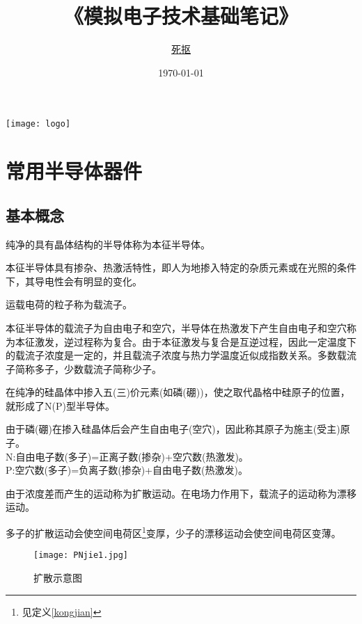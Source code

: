 \documentclass[cn,pad,11pt,geye]{elegantnote}
\title{\ttfamily《模拟电子技术基础笔记》}
\author{\href{https://github.com/sikouhjw}{死抠}}
\date{\today}
\begin{document}
\maketitle
\centerline{\texttt{[image: logo]}}

\section{常用半导体器件}
\subsection{基本概念}
\begin{definition}[本征半导体]
	纯净的具有晶体结构的半导体称为本征半导体。
\end{definition}
\begin{note}
	本征半导体具有掺杂、热激活特性，即人为地掺入特定的杂质元素或在光照的条件下，其导电性会有明显的变化。
\end{note}
\begin{definition}[载流子]
	运载电荷的粒子称为载流子。
\end{definition}
\begin{note}
	本征半导体的载流子为自由电子和空穴，半导体在热激发下产生自由电子和空穴称为本征激发，逆过程称为复合。由于本征激发与复合是互逆过程，因此一定温度下的载流子浓度是一定的，并且载流子浓度与热力学温度近似成指数关系。多数载流子简称多子，少数载流子简称少子。
\end{note}
\begin{definition}[N(P)型半导体]
	在纯净的硅晶体中掺入五(三)价元素(如磷(硼))，使之取代晶格中硅原子的位置，就形成了N(P)型半导体。
\end{definition}
\begin{note}
	由于磷(硼)在掺入硅晶体后会产生自由电子(空穴)，因此称其原子为施主(受主)原子。\\
	N:自由电子数(多子)=正离子数(掺杂)+空穴数(热激发)。\\
	P:空穴数(多子)=负离子数(掺杂)+自由电子数(热激发)。
\end{note}
\begin{definition}
	由于浓度差而产生的运动称为扩散运动。在电场力作用下，载流子的运动称为漂移运动。
\end{definition}
\begin{note}
	多子的扩散运动会使空间电荷区\footnote{见定义\ref{kongjian}}变厚，少子的漂移运动会使空间电荷区变薄。
\end{note}
\begin{figure}[h]
	\centering
	\texttt{[image: PNjie1.jpg]}
	\caption{扩散示意图}
\end{figure}
\end{document}
